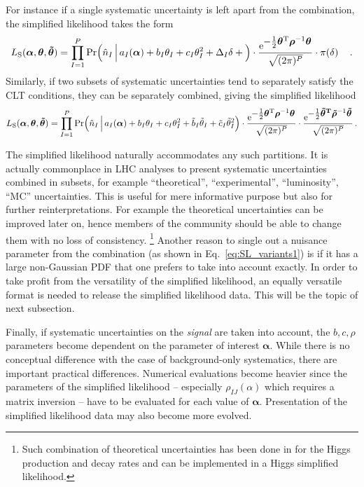 \documentclass[11pt]{article}
\newcommand{\be}{\begin{equation}}
\newcommand{\ee}{\end{equation}}
\begin{document}



For instance if a single systematic uncertainty  is left apart from the combination, the simplified likelihood takes the form
\be
 L_{\rm{S}}(\bm{\alpha},\bm{\theta},\bm{\tilde \theta}) = \prod_{I=1}^P \mathrm{Pr}\Big( \hat{n}_I\,\Big|\,a_{I}(\bm{\alpha})+b_I\theta_I+c_I\theta_I^2 + \Delta_I  \delta+   \Big) \cdot
    \frac{ \mathrm{e}^{{\textstyle-\frac{1}{2}\bm \theta^{\rm T} \bm{\rho}^{-1} \bm \theta}}}{\sqrt{(2\pi)^P }}
    \cdot \pi(\delta)
 \quad     \,. \label{eq:SL_variants1}
\ee
Similarly, if two subsets of systematic uncertainties tend to  separately satisfy the CLT conditions,  they can be separately combined, giving the simplified likelihood
\be
 L_{\rm{S}}(\bm{\alpha},\bm{\theta},\bm{\tilde \theta}) = \prod_{I=1}^P \mathrm{Pr}\Big( \hat{n}_I\,\Big|\,a_{I}(\bm{\alpha})+b_I\theta_I+c_I\theta_I^2 + \tilde b_I \tilde \theta_I+ \tilde c_I \tilde \theta_I^2  \Big) \cdot
    \frac{ \mathrm{e}^{{\textstyle-\frac{1}{2}\bm \theta^{\rm T} \bm{\rho}^{-1} \bm \theta}}}{\sqrt{(2\pi)^P }}
\cdot \frac{ \mathrm{e}^{{\textstyle-\frac{1}{2}\bm{ \tilde\theta^{\rm T}} \bm{\tilde \rho}^{-1} \bm{ \tilde\theta}}}}{\sqrt{(2\pi)^P }}
      \,. \label{eq:SL_variants2}
\ee

The simplified likelihood naturally accommodates any such partitions. It is actually  commonplace in LHC analyses   to present systematic uncertainties combined in subsets, for example ``theoretical'', ``experimental'', ``luminosity'', ``MC'' uncertainties. This is useful for mere informative purpose but also for further reinterpretations.
For example the theoretical uncertainties can be improved later on, hence members of the community should be able to change them
 with no loss of consistency. \footnote{Such combination of theoretical uncertainties  has been done in \cite{Arbey:2016kqi}  for the Higgs production and decay rates and can be implemented in a Higgs simplified likelihood.}
Another reason to single out a nuisance parameter  from the combination (as shown in Eq.~\eqref{eq:SL_variants1})
is if it has a large non-Gaussian PDF that one prefers to take into account exactly.
In order to take profit from the  versatility of the simplified likelihood, an equally  versatile format is needed to release the simplified likelihood data. This will be the topic of next subsection.

Finally, if systematic uncertainties on the \textit{signal} are taken into account, the $b,c,\rho$ parameters  become dependent on the parameter of interest ${\bm \alpha}$. While there is no conceptual difference with the case  of background-only systematics, there are important practical differences. Numerical evaluations  become heavier  since  the parameters of the simplified likelihood -- especially $\rho_{IJ}(\alpha)$ which requires a matrix inversion -- have to be evaluated for each value of ${\bm \alpha}$. Presentation of the simplified likelihood data may also become more evolved.
\end{document}
